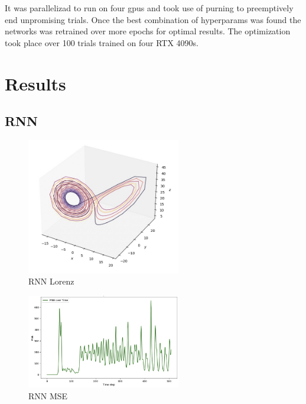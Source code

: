 \documentclass[11pt]{article}
\begin{document}
It was parallelizad to run on four gpus and took use of purning to preemptively end unpromising trials. Once the best combination of hyperparams was found the networks was retrained over more epochs for optimal results. The optimization took place over 100 trials trained on four RTX 4090s.

\section{Results}
\subsection{RNN}

\begin{figure}[h]
\centering
\includegraphics[width=0.6\textwidth]{rnn_lorenz.jpeg}
\caption{RNN Lorenz}
\end{figure}

\begin{figure}[h]
\centering
\includegraphics[width=0.6\textwidth]{rnn_mse.jpeg}
\caption{RNN MSE}
\end{figure}
\end{document}
